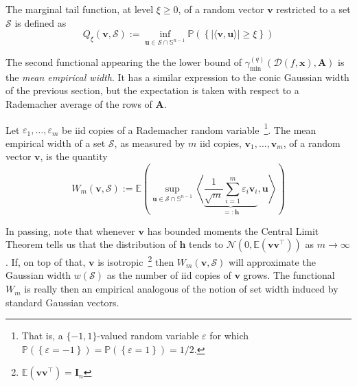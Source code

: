 \begin{definition}\label{def:marginal_tail_function}
    The marginal tail function, at level $\xi \geq 0$, of a random vector $\mathbf{v}$ restricted to a set $\mathcal{S}$ is defined as
    \begin{equation}
        Q_{\xi}(\mathbf{v}, \mathcal{S}) := \underset{\mathbf{u} \in \mathcal{S} \cap \mathbb{S}^{n-1}}{\inf} \mathbb{P} \left ( \left \{ | \langle \mathbf{v}, \mathbf{u}\rangle | \geq \xi \right \} \right )
    \end{equation}
\end{definition}

The second functional appearing the the lower bound of $\gamma_{\min}^{(q)} \left ( \mathcal{D}( f, \mathbf{x}), \mathbf{A} \right )$ is the \emph{mean empirical width}. It has a similar expression to the conic Gaussian width of the previous section, but the expectation is taken with respect to a Rademacher average of the rows of $\mathbf{A}$.

\begin{definition}\label{def:mean_empirical_width}
    Let $\varepsilon_1, \dots, \varepsilon_m$ be \acrshort{iid} copies of a Rademacher random variable~\footnote{That is, a $\{-1, 1\}$-valued random variable $\varepsilon$ for which $\mathbb{P} \left ( \left \{  \varepsilon = -1 \right \}\right ) = \mathbb{P} \left ( \left \{  \varepsilon = 1 \right \}\right ) = 1/2$.}. The mean empirical width of a set $\mathcal{S}$, as measured by $m$ \acrshort{iid} copies, $\mathbf{v}_1, \dots, \mathbf{v}_m$, of a random vector $\mathbf{v}$, is the quantity
    \begin{equation}
        W_{m}(\mathbf{v}, \mathcal{S}) := \mathbb{E} \left ( \underset{\mathbf{u} \in \mathcal{S} \cap \mathbb{S}^{n-1}}{\sup} \left \langle \underbrace{\frac{1}{\sqrt{m}} \sum_{i=1}^{m} \varepsilon_i \mathbf{v}_i}_{=:\mathbf{h}}, \mathbf{u} \right \rangle \right )
    \end{equation}
\end{definition}

In passing, note that whenever $\mathbf{v}$ has bounded moments the Central Limit Theorem tells us that the distribution of $\mathbf{h}$ tends to $\mathcal{N}(0, \mathbb{E} \left ( \mathbf{v}\mathbf{v}^\top \right ))$ as $m \to \infty$. If, on top of that, $\mathbf{v}$ is isotropic~\footnote{$\mathbb{E} \left ( \mathbf{v}\mathbf{v}^\top \right )= \mathbf{I}_n$} then $W_{m}(\mathbf{v}, \mathcal{S})$ will approximate the Gaussian width $w(\mathcal{S})$ as the number of \acrshort{iid} copies of $\mathbf{v}$ grows. The functional $W_{m}$ is really then an empirical  analogous of the notion of set width induced by standard Gaussian vectors.

